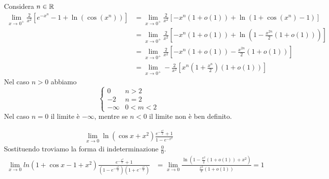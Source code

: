 \documentclass[a4paper]{article}
\begin{document}
\begin{snippetexercise}{}
    Considera \(n \in \mathbb{R}\)
    \begin{align*}
        \lim_{x\to 0^+} \frac{2}{x^2} \left[
            e^{-x^n} - 1 + \ln\left(\cos(x^n)\right)
        \right]
        &= \lim_{x\to 0^+} \frac{2}{x^2} \left[
            -x^n(1 + o(1)) + \ln\left(1 + \cos(x^n) - 1\right)
        \right] \\
        &= \lim_{x\to 0^+} \frac{2}{x^2} \left[
            -x^n(1 + o(1)) + \ln\left(1 - \frac{x^{2n}}{2}(1 + o(1))\right)
        \right] \\
        &= \lim_{x\to 0^+} \frac{2}{x^2} \left[
            -x^n(1 + o(1)) -\frac{x^{2n}}{2}(1 + o(1))
        \right] \\
        &= \lim_{x\to 0^+} - \frac{2}{x^2} \left[
            x^n \left(1 + \frac{x^n}{2}\right)(1 + o(1))
        \right]
    \end{align*}
    Nel caso \(n>0\) abbiamo
    \[
        \begin{cases}
            0 & n>2 \\
            -2 & n=2 \\
            -\infty & 0 < m < 2
        \end{cases}
    \]
    Nel caso \(n=0\) il limite è \(-\infty\), mentre se \(n<0\) il limite
    non è ben definito.
\end{snippetexercise}

\begin{snippetexercise}{}
    \begin{align*}
        \lim_{x\to 0} \ln(\cos x + x^2) \frac{e^{-\frac{x^2}{2}} + 1}{1-e^{-x^2}}
    \end{align*}
    Sostituendo troviamo la forma di indeterminazione \(\frac{0}{0}\).
    \begin{align*}
        \lim_{x\to 0} ln(1 + \cos x - 1 + x^2) \frac{e^{-\frac{x^2}{2}} + 1}{\left(1-e^{-\frac{x^2}{2}}\right)\left(1+e^{-\frac{x^2}{2}}\right)}
        &= \lim_{x\to 0} \frac{
            \ln\left(
                1 - \frac{x^2}{2}(1 + o(1)) + x^2
            \right)
        }{
            \frac{x^2}{2}(1 + o(1))
        } = 1
    \end{align*}
\end{snippetexercise}
\end{document}
